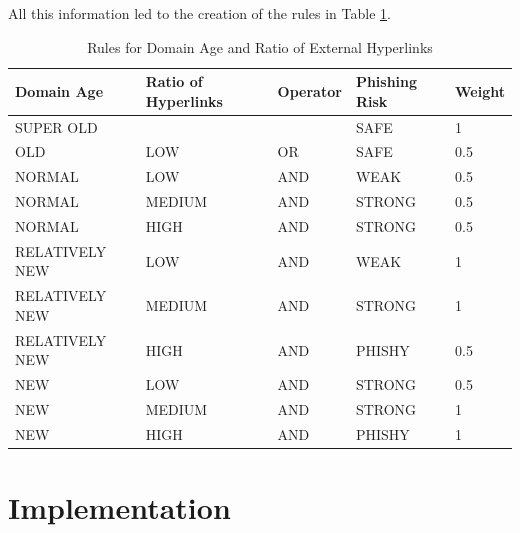 \documentclass[11pt]{article}
\begin{document}
All this information led to the creation of the rules in Table \ref{domainage_hyperlinks_rules}.

\begin{table}[H]
    \centering
    \begin{tabular}{|l|l|l|l|l|}
    \hline
    \textbf{Domain Age}     & \textbf{Ratio of Hyperlinks} & \textbf{Operator} & \textbf{Phishing Risk} & \textbf{Weight} \\ \hline
    SUPER OLD      &                     &                   & SAFE                   & 1               \\ \hline
    OLD            & LOW                 & OR                & SAFE                   & 0.5             \\ \hline
    NORMAL         & LOW                 & AND               & WEAK                   & 0.5             \\ \hline
    NORMAL         & MEDIUM              & AND               & STRONG                 & 0.5             \\ \hline
    NORMAL         & HIGH                & AND               & STRONG                 & 0.5             \\ \hline
    RELATIVELY NEW & LOW                 & AND               & WEAK                   & 1               \\ \hline
    RELATIVELY NEW & MEDIUM              & AND               & STRONG                 & 1               \\ \hline
    RELATIVELY NEW & HIGH                & AND               & PHISHY                 & 0.5             \\ \hline
    NEW            & LOW                 & AND               & STRONG                 & 0.5             \\ \hline
    NEW            & MEDIUM              & AND               & STRONG                 & 1               \\ \hline
    NEW            & HIGH                & AND               & PHISHY                 & 1               \\ \hline
    \end{tabular}
    \caption{Rules for Domain Age and Ratio of External Hyperlinks}
    \label{domainage_hyperlinks_rules}
\end{table}

\section{Implementation}
\end{document}
